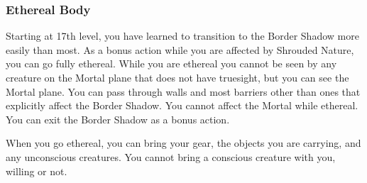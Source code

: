 \subsubsection{Ethereal Body}
Starting at 17th level, you have learned to transition to the Border Shadow more easily than most. As a bonus action while you are affected by Shrouded Nature, you can go fully ethereal. While you are ethereal you cannot be seen by any creature on the Mortal plane that does not have truesight, but you can see the Mortal plane. You can pass through walls and most barriers other than ones that explicitly affect the Border Shadow. You cannot affect the Mortal while ethereal. You can exit the Border Shadow as a bonus action.

When you go ethereal, you can bring your gear, the objects you are carrying, and any unconscious creatures. You cannot bring a conscious creature with you, willing or not.